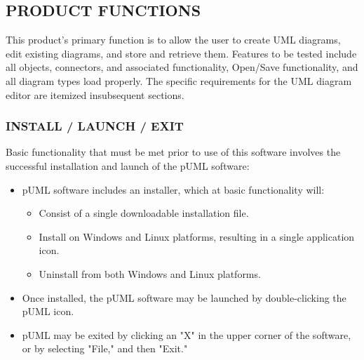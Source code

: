 \documentclass[twoside,letterpaper]{article}
\begin{document}
\subsection[PRODUCT FUNCTIONS ]
{\bfseries PRODUCT FUNCTIONS}

This product's primary function is to allow the user to create UML diagrams, edit existing diagrams, and store and retrieve them. \newline 
Features to be tested include all objects, connectors, and associated functionality, Open/Save functionality, and all diagram types load properly. The specific requirements for the UML diagram editor are itemized insubsequent sections. 

\bigskip


\subsubsection[INSTALL / LAUNCH / EXIT]
{\bfseries INSTALL / LAUNCH / EXIT}

Basic functionality that must be met prior to use of this software involves the successful installation and launch of the pUML software:
\begin{itemize}
\item pUML software includes an installer, which at basic functionality will:
\begin{itemize}
\item Consist of a single downloadable installation file.
\item Install on Windows and Linux platforms, resulting in a single application icon.
\item Uninstall from both Windows and Linux platforms.
\end{itemize}
\item Once installed, the pUML software may be launched by double-clicking the pUML icon.
\item pUML may be exited by clicking an "X" in the upper corner of the software, or by selecting "File,"  and then "Exit." 
\end{itemize}

\bigskip
\end{document}
